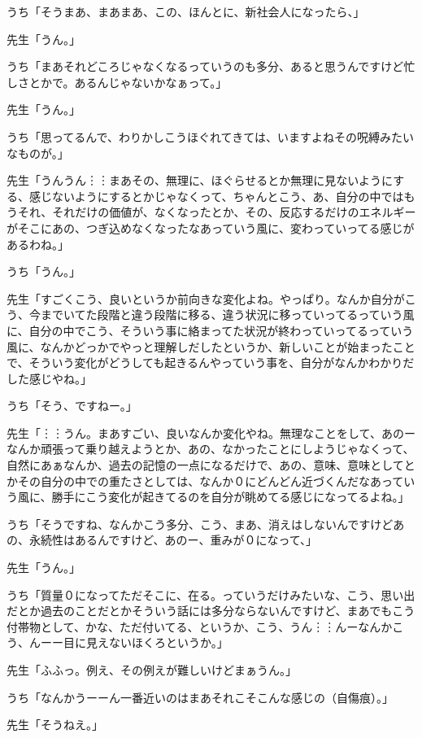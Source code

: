 \documentclass[b5j,twoside,twocolumn]{utarticle}
\begin{document}
\begin{description}
\item うち「そうまあ、まあまあ、この、ほんとに、新社会人になったら、」
\item 先生「うん。」
\item うち「まあそれどころじゃなくなるっていうのも多分、あると思うんですけど忙しさとかで。あるんじゃないかなぁって。」
\item 先生「うん。」
\item うち「思ってるんで、わりかしこうほぐれてきては、いますよねその呪縛みたいなものが。」
\item 先生「うんうん︙︙まあその、無理に、ほぐらせるとか無理に見ないようにする、感じないようにするとかじゃなくって、ちゃんとこう、あ、自分の中ではもうそれ、それだけの価値が、なくなったとか、その、反応するだけのエネルギーがそこにあの、つぎ込めなくなったなあっていう風に、変わっていってる感じがあるわね。」
\item うち「うん。」
\item 先生「すごくこう、良いというか前向きな変化よね。やっぱり。なんか自分がこう、今までいてた段階と違う段階に移る、違う状況に移っていってるっていう風に、自分の中でこう、そういう事に絡まってた状況が終わっていってるっていう風に、なんかどっかでやっと理解しだしたというか、新しいことが始まったことで、そういう変化がどうしても起きるんやっていう事を、自分がなんかわかりだした感じやね。」
\item うち「そう、ですねー。」
\item 先生「︙︙うん。まあすごい、良いなんか変化やね。無理なことをして、あのーなんか頑張って乗り越えようとか、あの、なかったことにしようじゃなくって、自然にあぁなんか、過去の記憶の一点になるだけで、あの、意味、意味としてとかその自分の中での重たさとしては、なんか０にどんどん近づくんだなあっていう風に、勝手にこう変化が起きてるのを自分が眺めてる感じになってるよね。」
\item うち「そうですね、なんかこう多分、こう、まあ、消えはしないんですけどあの、永続性はあるんですけど、あのー、重みが０になって、」
\item 先生「うん。」
\item うち「質量０になってただそこに、在る。っていうだけみたいな、こう、思い出だとか過去のことだとかそういう話には多分ならないんですけど、まあでもこう付帯物として、かな、ただ付いてる、というか、こう、うん︙︙んーなんかこう、んーー目に見えないほくろというか。」
\item 先生「ふふっ。例え、その例えが難しいけどまぁうん。」
\item うち「なんかうーーん一番近いのはまあそれこそこんな感じの（自傷痕）。」
\item 先生「そうねえ。」

\end{description}
\end{document}
